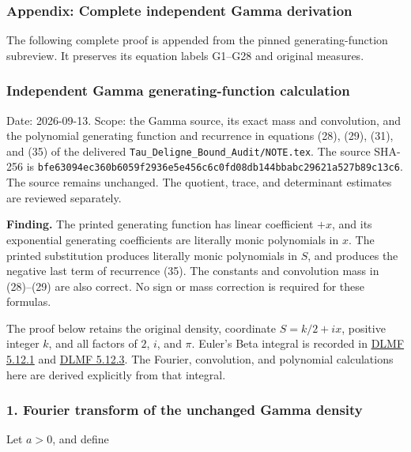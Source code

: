 \subsubsection{Appendix: Complete independent Gamma derivation}\label{endpoint-gamma_review--appendix-complete-independent-gamma-derivation}

The following complete proof is appended from the pinned generating-function subreview. It preserves its equation labels G1--G28 and original measures.

\subsubsection{Independent Gamma generating-function calculation}\label{endpoint-gamma_review--independent-gamma-generating-function-calculation}

Date: 2026-09-13. Scope: the Gamma source, its exact mass and convolution, and the polynomial generating function and recurrence in equations (28), (29), (31), and (35) of the delivered \nolinkurl{Tau_Deligne_Bound_Audit/NOTE.tex}. The source SHA-256 is \nolinkurl{bfe63094ec360b6059f2936e5e456c6c0fd08db144bbabc29621a527b89c13c6}. The source remains unchanged. The quotient, trace, and determinant estimates are reviewed separately.

\textbf{Finding.} The printed generating function has linear coefficient \(+x\), and its exponential generating coefficients are literally monic polynomials in \(x\). The printed substitution produces literally monic polynomials in \(S\), and produces the negative last term of recurrence (35). The constants and convolution mass in (28)--(29) are also correct. No sign or mass correction is required for these formulas.

The proof below retains the original density, coordinate \(S=k/2+ix\), positive integer \(k\), and all factors of \(2\), \(i\), and \(\pi\). Euler's Beta integral is recorded in \href{https://dlmf.nist.gov/5.12.E1}{DLMF 5.12.1} and \href{https://dlmf.nist.gov/5.12.E3}{DLMF 5.12.3}. The Fourier, convolution, and polynomial calculations here are derived explicitly from that integral.

\subsubsection{1. Fourier transform of the unchanged Gamma density}\label{endpoint-gamma_review--fourier-transform-of-the-unchanged-gamma-density}

Let \(a>0\), and define


